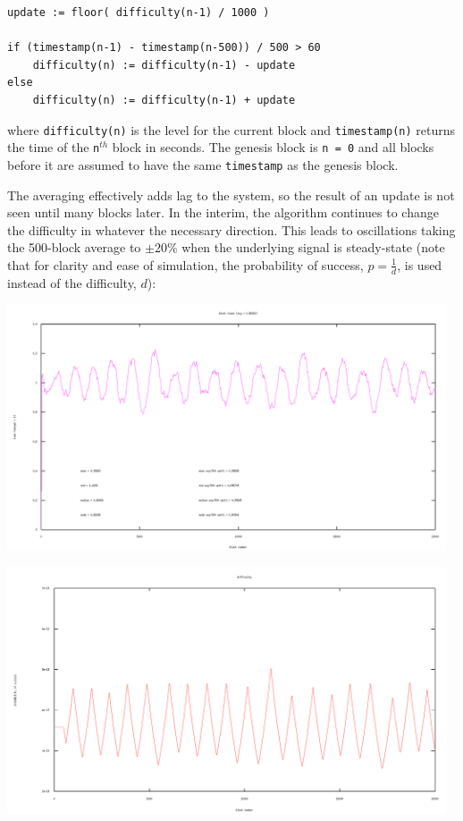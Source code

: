 \documentclass[10pt,a4paper]{article}
\begin{document}
\begin{verbatim}
update := floor( difficulty(n-1) / 1000 )

if (timestamp(n-1) - timestamp(n-500)) / 500 > 60
    difficulty(n) := difficulty(n-1) - update
else
    difficulty(n) := difficulty(n-1) + update
\end{verbatim}
where {\tt difficulty(n)} is the level for the current block and {\tt timestamp(n)} returns the time of the {\tt n}$^{th}$ block in seconds. The genesis block is {\tt n = 0} and all blocks before it are assumed to have the same {\tt timestamp} as the genesis block.

The averaging effectively adds lag to the system, so the result of an update is not seen until many blocks later. In the interim, the algorithm continues to change the difficulty in whatever the necessary direction. This leads to oscillations taking the 500-block average to $\pm 20\%$ when the underlying signal is steady-state (note that for clarity and ease of simulation, the probability of success, $p = \frac{1}{d}$, is used instead of the difficulty, $d$):

\includegraphics[width=13cm]{Diagrams/SimulationGraphs/simulation_avg-500_upd-1_.png}

\includegraphics[width=13cm]{Diagrams/SimulationGraphs/simulation_avg-500_upd-1_diff.png}
\end{document}
